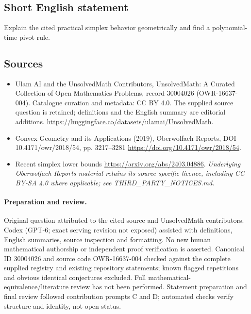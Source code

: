 \documentclass[11pt]{article}
\begin{document}
\subsection{Short English statement}
Explain the cited practical simplex behavior geometrically and find a polynomial-time pivot rule.
\subsection{Sources}
\begin{itemize}
\item[\hypertarget{source:30004026:1}{S1}] Ulam AI and the UnsolvedMath Contributors, UnsolvedMath: A Curated Collection of Open Mathematics Problems, record 30004026 (OWR-16637-004). Catalogue curation and metadata: CC BY 4.0. The supplied source question is retained; definitions and the English summary are editorial additions.
\url{https://huggingface.co/datasets/ulamai/UnsolvedMath}.
\item[\hypertarget{source:30004026:2}{S2}] Convex Geometry and its Applications (2019), Oberwolfach Reports, DOI 10.4171/owr/2018/54, pp. 3217--3281
\url{https://doi.org/10.4171/owr/2018/54}.
\item[\hypertarget{source:30004026:3}{S3}] Recent simplex lower bounds
\url{https://arxiv.org/abs/2403.04886}.
\textit{Underlying Oberwolfach Reports material retains its source-specific licence, including CC BY-SA 4.0 where applicable; see THIRD\_PARTY\_NOTICES.md.}
\end{itemize}
\paragraph{Preparation and review.}
Original question attributed to the cited source and UnsolvedMath contributors. Codex (GPT-6; exact serving revision not exposed) assisted with definitions, English summaries, source inspection and formatting. No new human mathematical authorship or independent proof verification is asserted. Canonical ID 30004026 and source code OWR-16637-004 checked against the complete supplied registry and existing repository statements; known flagged repetitions and obvious identical conjectures excluded. Full mathematical-equivalence/literature review has not been performed. Statement preparation and final review followed contribution prompts C and D; automated checks verify structure and identity, not open status.
\label{end:30004026}
\end{document}
